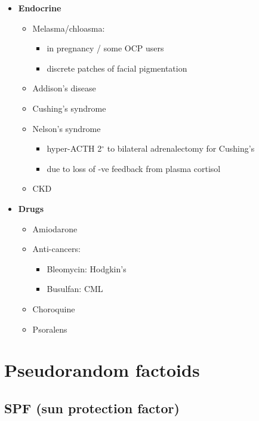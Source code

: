 \documentclass[
  12pt,
]{memoir}
\providecommand{\tightlist}{%
  \setlength{\itemsep}{0pt}\setlength{\parskip}{0pt}}
\begin{document}
\begin{itemize}
\tightlist
\item
  \textbf{Endocrine}

  \begin{itemize}
  \tightlist
  \item
    Melasma/chloasma:

    \begin{itemize}
    \tightlist
    \item
      in pregnancy / some OCP users
    \item
      discrete patches of facial pigmentation
    \end{itemize}
  \item
    Addison's disease
  \item
    Cushing's syndrome
  \item
    Nelson's syndrome

    \begin{itemize}
    \tightlist
    \item
      hyper-ACTH 2\(^\circ\) to bilateral adrenalectomy for Cushing's
    \item
      due to loss of -ve feedback from plasma cortisol
    \end{itemize}
  \item
    CKD
  \end{itemize}
\item
  \textbf{Drugs}

  \begin{itemize}
  \tightlist
  \item
    Amiodarone
  \item
    Anti-cancers:

    \begin{itemize}
    \tightlist
    \item
      Bleomycin: Hodgkin's
    \item
      Busulfan: CML
    \end{itemize}
  \item
    Choroquine
  \item
    Psoralens
  \end{itemize}
\end{itemize}

\hypertarget{pseudorandom-factoids}{%
\section{Pseudorandom factoids}\label{pseudorandom-factoids}}

\hypertarget{spf-sun-protection-factor}{%
\subsection{SPF (sun protection
factor)}\label{spf-sun-protection-factor}}
\end{document}

